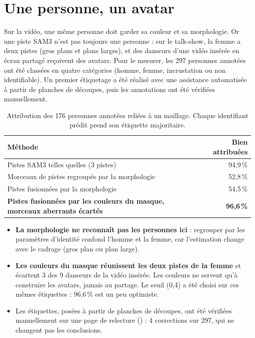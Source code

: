 \documentclass[11pt,a4paper]{report}
\newcommand{\code}[1]{\texttt{\detokenize{#1}}}
\begin{document}
\section{Une personne, un avatar}
\label{sec:res-people}

Sur la vidéo, une même personne doit garder sa couleur et sa morphologie. Or une piste SAM3 n'est pas toujours une personne : sur le
talk-show, la femme a deux pistes (gros plans et plans larges), et des danseurs d'une vidéo insérée en écran partagé reçoivent des
avatars. Pour le mesurer, les 297 personnes annotées ont été classées en quatre catégories (homme, femme, incrustation ou non identifiable). 
Un premier étiquetage a été réalisé avec une assistance automatisée à partir de planches de découpes, puis les annotations ont été vérifiées manuellement.

\begin{table}[H]
\centering
\caption{Attribution des 176 personnes annotées reliées à un maillage. Chaque identifiant prédit prend son étiquette majoritaire.}
\label{tab:people}
\small
\begin{tabularx}{\textwidth}{@{}Yr@{}}
\toprule
Méthode & Bien attribuées \\
\midrule
Pistes SAM3 telles quelles (3 pistes) & 94,9\,\% \\
Morceaux de pistes regroupés par la morphologie & 52,8\,\% \\
Pistes fusionnées par la morphologie & 54,5\,\% \\
\textbf{Pistes fusionnées par les couleurs du masque, morceaux aberrants écartés} & \textbf{96,6\,\%} \\
\bottomrule
\end{tabularx}
\end{table}

\begin{itemize}
    \item \textbf{La morphologie ne reconnaît pas les personnes ici} : regrouper par les paramètres d'identité confond l'homme et la
    femme, car l'estimation change avec le cadrage (gros plan ou plan large).
    \item \textbf{Les couleurs du masque réunissent les deux pistes de la femme} et écartent 3 des 9 danseurs de la vidéo insérée.
    Les couleurs ne servent qu'à construire les avatars, jamais au partage. Le seuil (0,4) a été choisi sur ces mêmes étiquettes :
    96,6\,\% est un peu optimiste.
    \item Les étiquettes, posées à partir de planches de découpes, ont été vérifiées manuellement sur une page de relecture
    (\code{review\_labels.py}) : 4 corrections sur 297, qui ne changent pas les conclusions.
\end{itemize}
\end{document}
